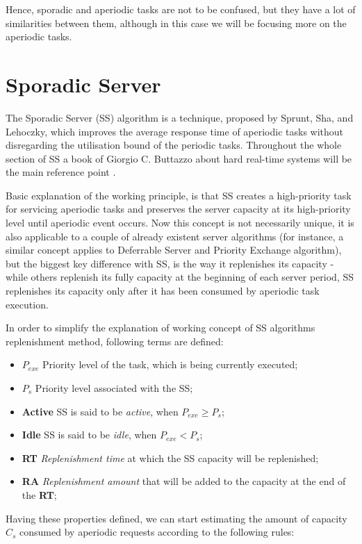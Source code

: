 \documentclass[conference]{IEEEtran}
\begin{document}
Hence, sporadic and aperiodic tasks are not to be confused, but they have a lot of similarities between them, although in this case we will be focusing more on the aperiodic tasks.

\section{Sporadic Server}
The Sporadic Server (SS) algorithm is a technique, proposed by Sprunt, Sha, and Lehoczky, which improves the average response time of aperiodic tasks without disregarding the utilisation bound of the periodic tasks. Throughout the whole section of SS a book of Giorgio C. Buttazzo about hard real-time systems will be the main reference point \cite{b1}.

Basic explanation of the working principle, is that SS creates a high-priority task for servicing aperiodic tasks and preserves the server capacity at its high-priority level until aperiodic event occurs. Now this concept is not necessarily unique, it is also applicable to a couple of already existent server algorithms (for instance, a similar concept applies to Deferrable Server and Priority Exchange algorithm), but the biggest key difference with SS, is the way it replenishes its capacity - while others replenish its fully capacity at the beginning of each server period, SS replenishes its capacity only after it has been consumed by aperiodic task execution.

In order to simplify the explanation of working concept of SS algorithms replenishment method, following terms are defined:

\begin{itemize}
    \item $P_{exe}$ Priority level of the task, which is being currently executed;
    \item $P_s$ Priority level associated with the SS;
    \item \textbf{Active} SS is said to be \textit{active}, when $P_{exe} \geq P_s$;
    \item \textbf{Idle} SS is said to be \textit{idle}, when $P_{exe} < P_s$;
    \item \textbf{RT} \textit{Replenishment time} at which the SS capacity will be replenished;
    \item \textbf{RA} \textit{Replenishment amount} that will be added to the capacity at the end of the \textbf{RT};
\end{itemize}

Having these properties defined, we can start estimating the amount of capacity $C_s$ consumed by aperiodic requests according to the following rules:
\end{document}
